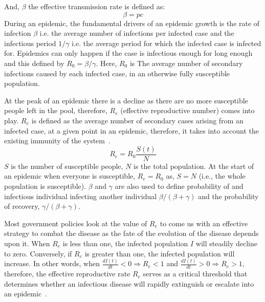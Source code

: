 \documentclass[tikz,fleqn,12pt]{wlscirep}
\begin{document}
And, $\beta$ the effective transmission rate is defined as:
\begin{equation}
  \beta = p c
  \label{eq:beta_effective_transmission_rate}
\end{equation}
During an epidemic, the fundamental drivers of an epidemic growth is the rate of infection $\beta$ i.e. the average number of infections per infected case and the infectious period $1/\gamma$ i.e. the average period for which the infected case is infected for. Epidemics can only happen if the case is infectious enough for long enough and this defined by $R_0 = \beta / \gamma$. Here, $R_0$ is The average number of secondary infections caused by each infected case, in an otherwise fully susceptible population.

At the peak of an epidemic there is a decline as there are no more susceptible people left in the pool, therefore, $R_e$ (effective reproductive number) comes into play. $R_e$ is defined as the average number of secondary cases arising from an infected case, at a given point in an epidemic, therefore, it takes into account the existing immunity of the system~\cite{MASSAD2017232}. 
\begin{equation}
  R_e = R_0 \frac{S(t)}{N}
  \label{eq:R_effective}
\end{equation}
$S$ is the number of susceptible people, $N$ is the total population. At the start of an epidemic when everyone is susceptible, $R_e = R_0$ as, $S = N$ (i.e., the whole population is susceptible). $\beta$ and $\gamma$ are also used to define probability of and infectious individual infecting another individual $\beta / (\beta + \gamma)$ and the probability of recovery, $\gamma / (\beta + \gamma)$.

Most government policies look at the value of $R_e$ to come us with an effective strategy to combat the disease as the fate of the evolution of the disease depends upon it. When $R_e$ is less than one, the infected population $I$ will steadily decline to zero. Conversely, if $R_e$ is greater than one, the infected population will increase. In other words, when $\frac{dI(t)}{dt} < 0 \Rightarrow R_e < 1$ and $\frac{dI(t)}{dt} > 0 \Rightarrow R_e > 1$, therefore, the effective reproductive rate $R_e$ serves as a critical threshold that determines whether an infectious disease will rapidly extinguish or escalate into an epidemic~\cite{Cooper2020}.
\end{document}
